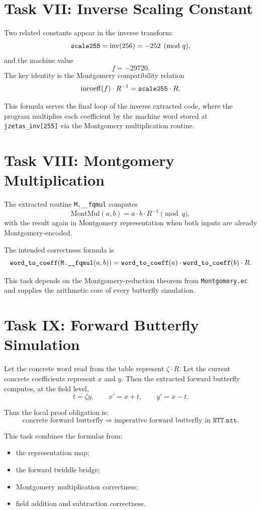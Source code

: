\documentclass[11pt]{article}
\newcommand{\code}[1]{\text{\texttt{#1}}}
\begin{document}
\section{Task VII: Inverse Scaling Constant}

Two related constants appear in the inverse transform:
\[
\code{scale255} = \operatorname{inv}(256) = -252 \pmod q,
\]
and the machine value
\[
f = -29720.
\]
The key identity is the Montgomery compatibility relation
\[
\operatorname{incoeff}(f)\cdot R^{-1}
=
\code{scale255}\cdot R.
\]

This formula serves the final loop of the inverse extracted code, where the
program multiplies each coefficient by the machine word stored at
\texttt{jzetas\_inv[255]} via the Montgomery multiplication routine.

\section{Task VIII: Montgomery Multiplication}

The extracted routine \texttt{M.\_\_fqmul} computes
\[
\mathrm{MontMul}(a,b)
=
a\cdot b\cdot R^{-1} \pmod q,
\]
with the result again in Montgomery representation when both inputs are
already Montgomery-encoded.

The intended correctness formula is
\[
\code{word\_to\_coeff}(\texttt{M.\_\_fqmul}(a,b))
=
\code{word\_to\_coeff}(a)\cdot \code{word\_to\_coeff}(b)\cdot R.
\]

This task depends on the Montgomery-reduction theorem from
\texttt{Montgomery.ec} and supplies the arithmetic core of every butterfly
simulation.

\section{Task IX: Forward Butterfly Simulation}

Let the concrete word read from the table represent \(\zeta\cdot R\). Let the
current concrete coefficients represent \(x\) and \(y\). Then the extracted
forward butterfly computes, at the field level,
\[
t = \zeta y,
\qquad
x' = x + t,
\qquad
y' = x - t.
\]

Thus the local proof obligation is:
\[
\text{concrete forward butterfly}
\Longrightarrow
\text{imperative forward butterfly in } \texttt{NTT.ntt}.
\]

This task combines the formulas from:
\begin{itemize}
\item the representation map;
\item the forward twiddle bridge;
\item Montgomery multiplication correctness;
\item field addition and subtraction correctness.
\end{itemize}
\end{document}
